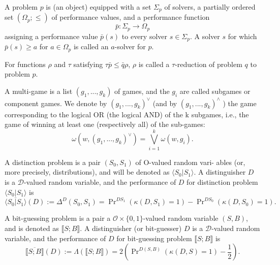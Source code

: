 \documentclass[a4paper,german]{article}
\newenvironment{customdef}[1]{\renewcommand\theinnercustomdef{#1}\innercustomdef}{\endinnercustomdef}
\begin{document}
\begin{customdef}{4.2}
  A problem $p$ is (an object) equipped with a set $\Sigma_p$ of solvers, a partially ordered set $(\Omega_p; \leq)$ of performance values, and a performance function
  \[
    \bar{p} : \Sigma_p \rightarrow \Omega_p
  \]
  assigning a performance value $\bar{p}(s)$ to every solver $s \in \Sigma_p$. A solver $s$ for which $\bar{p}(s) \geq a$ for $a \in \Omega_p$ is called an $a$-solver for $p$.
\end{customdef}

\begin{customdef}{4.3}
  For functions $\rho$ and $\tau$ satisfying $\tau \bar{p} \leq \bar{q} \rho$, $\rho$ is called a $\tau$-reduction of problem $q$ to problem $p$.
\end{customdef}

\begin{customdef}{4.6}
  A multi-game is a list $(g_1, ..., g_k)$ of games, and the $g_i$ are called subgames or component games. We denote by $(g_1, ..., g_k )^{\lor}$ (and by $(g_1, ..., g_k)^{\land}$ ) the game corresponding to the logical OR (the logical AND) of the k subgames, i.e., the game of winning at least one (respectively all) of the sub-games:
  \[
    \omega(w, (g_1, ..., g_k)^{\lor}) = \bigvee\limits_{i=1}^k \omega(w, g_i)
  .\]
\end{customdef}

\begin{customdef}{4.7}
  A distinction problem is a pair $(S_0, S_1)$ of O-valued random vari-
  ables (or, more precisely, distributions), and will be denoted as $\langle S_0 | S_1\rangle$. A distinguisher $D$ is a $\mathcal{D}$-valued random variable, and the performance of $D$ for distinction problem $\langle S_0 | S_1\rangle$ is
  \[
    \overline{\langle S_0 | S_1\rangle}(D) := \Delta^D(S_0, S_1) = \Pr\nolimits^{DS_1}(\kappa(D, S_1)=1) - \Pr\nolimits^{DS_0}(\kappa(D, S_0)=1)
  .\]
\end{customdef}

\begin{customdef}{4.8}
  A bit-guessing problem is a pair a $\mathcal{O} \times \{0, 1\}$-valued random variable $(S, B)$, and is denoted as $\llbracket S; B \rrbracket$. A distinguisher (or bit-guesser) $D$ is a $\mathcal{D}$-valued random variable, and the performance of $D$ for bit-guessing problem $\llbracket S; B \rrbracket$ is
  \[
    \overline{\llbracket S; B \rrbracket}(D) := \Lambda(\llbracket S; B \rrbracket) = 2 \left( \Pr\nolimits^{D(S,B)}(\kappa(D,S) = 1) - \frac{1}{2} \right)
  .\]
\end{customdef}
\end{document}
